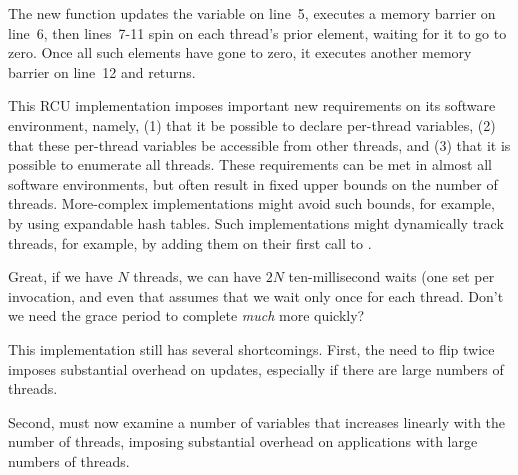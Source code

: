 The new  function updates the
 variable on line~5, executes a memory barrier on line~6,
then lines~7-11 spin on each thread's prior  element,
waiting for it to go to zero.
Once all such elements have gone to zero,
it executes another memory barrier on line~12 and returns.

This RCU implementation imposes important new requirements on its
software environment, namely, (1) that it be possible to declare
per-thread variables, (2) that these per-thread variables be accessible
from other threads, and (3) that it is possible to enumerate all threads.
These requirements can be met in almost all software environments,
but often result in fixed upper bounds on the number of threads.
More-complex implementations might avoid such bounds, for example, by using
expandable hash tables.
Such implementations might dynamically track threads, for example, by
adding them on their first call to .

\QuickQuiz{}
	Great, if we have $N$ threads, we can have $2N$ ten-millisecond
	waits (one set per  invocation,
	and even that assumes that we wait only once for each thread.
	Don't we need the grace period to complete \emph{much} more quickly?
 \QuickQuizEnd

This implementation still has several shortcomings.
First, the need to flip  twice imposes substantial overhead
on updates, especially if there are large numbers of threads.

Second,  must now examine a number of variables
that increases linearly with the number of threads, imposing substantial
overhead on applications with large numbers of threads.

